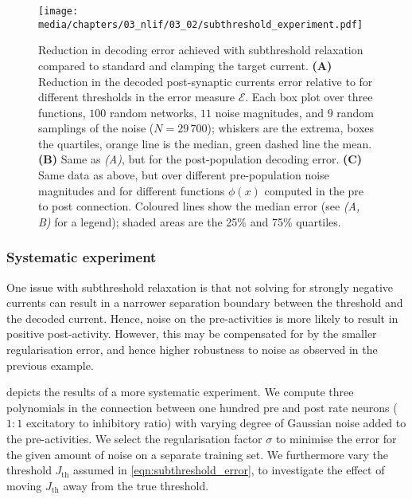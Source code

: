 \begin{figure}[t]
	\texttt{[image: media/chapters/03\_nlif/03\_02/subthreshold\_experiment.pdf]}%
	{\label{fig:subthreshold_experiment_a}}%
	{\label{fig:subthreshold_experiment_b}}%
	{\label{fig:subthreshold_experiment_c}}%
	\caption[Reduction in decoding error achieved with subthreshold relaxation]{Reduction in decoding error achieved with subthreshold relaxation compared to standard \NNLS and clamping the target current.
	\textbf{(A)} Reduction in the decoded post-synaptic currents error relative to \NNLS for different thresholds in the error measure $\mathcal{E}$.
	Each box plot over three functions, $100$ random networks, $11$ noise magnitudes, and $9$ random samplings of the noise ($N = 29\,700$); whiskers are the extrema, boxes the quartiles, orange line is the median, green dashed line the mean.
	\textbf{(B)}
	Same as \emph{(A)}, but for the post-population decoding error.
	\textbf{(C)} Same data as above, but over different pre-population noise magnitudes and for different functions $\phi(x)$ computed in the pre to post connection.
	Coloured lines show the median error (see \emph{(A, B)} for a legend); shaded areas are the 25\% and 75\% quartiles.
	}
	\label{fig:subthreshold_experiment}
\end{figure}

\subsubsection{Systematic experiment}
One issue with subthreshold relaxation is that not solving for strongly negative currents can result in a narrower separation boundary between the threshold and the decoded current.
Hence, noise on the pre-activities is more likely to result in positive post-activity.
However, this may be compensated for by the smaller regularisation error, and hence higher robustness to noise as observed in the previous example.

 depicts the results of a more systematic experiment.
We compute three polynomials in the connection between one hundred pre and post \LIF rate neurons ($1\!\!:\!\!1$ excitatory to inhibitory ratio) with varying degree of Gaussian noise added to the pre-activities.
We select the regularisation factor $\sigma$ to minimise the error for the given amount of noise on a separate training set.
We furthermore vary the threshold $J_\mathrm{th}$ assumed in \cref{eqn:subthreshold_error}, to investigate the effect of moving $J_\mathrm{th}$ away from the true threshold.

